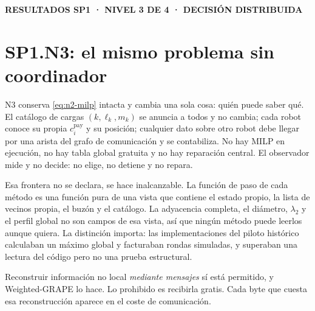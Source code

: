 \documentclass[12pt,a4paper]{article}
\newcommand{\leveltag}[1]{%
  \noindent\colorbox{VIUDark}{%
    \parbox{\dimexpr\textwidth-2\fboxsep\relax}{%
      \color{white}\sffamily\bfseries\small #1%
    }%
  }\par\smallskip
}
\begin{document}
\clearpage

\leveltag{RESULTADOS SP1 · NIVEL 3 DE 4 · DECISIÓN DISTRIBUIDA}
\section*{SP1.N3: el mismo problema sin coordinador}

N3 conserva \eqref{eq:n2-milp} intacta y cambia una sola cosa: quién puede saber
qué. El catálogo de cargas $(k,\ell_k,m_k)$ se anuncia a todos y no cambia; cada
robot conoce su propia $c_i^{\mathrm{pay}}$ y su posición; cualquier dato sobre
otro robot debe llegar por una arista del grafo de comunicación y se
contabiliza. No hay MILP en ejecución, no hay tabla global gratuita y no hay
reparación central. El observador mide y no decide: no elige, no detiene y no
repara.

Esa frontera no se declara, se hace inalcanzable. La función de paso de cada
método es una función pura de una vista que contiene el estado propio, la lista
de vecinos propia, el buzón y el catálogo. La adyacencia completa, el diámetro,
$\lambda_2$ y el perfil global no son campos de esa vista, así que ningún método
puede leerlos aunque quiera. La distinción importa: las implementaciones del
piloto histórico calculaban un máximo global y facturaban rondas simuladas, y
superaban una lectura del código pero no una prueba estructural.

Reconstruir información no local \emph{mediante mensajes} sí está permitido, y
Weighted-GRAPE lo hace. Lo prohibido es recibirla gratis. Cada byte que cuesta
esa reconstrucción aparece en el coste de comunicación.
\end{document}
